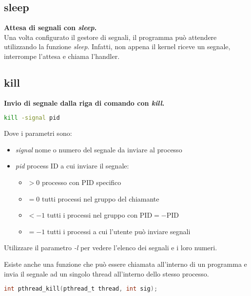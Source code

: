 \subsection{sleep}
\textbf{Attesa di segnali con \textit{sleep}.}\\
Una volta configurato il gestore di segnali, il programma può attendere utilizzando la funzione \textit{sleep}. Infatti, non appena il kernel riceve un segnale, interrompe l'attesa e chiama l'handler.
\subsection{kill}
\textbf{Invio di segnale dalla riga di comando con \textit{kill}.}\\
\begin{lstlisting}[language=BASH]
	kill -signal pid
\end{lstlisting}
Dove i parametri sono:
\begin{itemize}
	\item \textit{signal} nome o numero del segnale da inviare al processo
	\item \textit{pid} process ID a cui inviare il segnale:
	\begin{itemize}
		\item $>0$ processo con PID specifico
		\item $=0$ tutti processi nel gruppo del chiamante
		\item $<-1$ tutti i processi nel gruppo con PID$=-$PID
		\item $=-1$ tutti i processi a cui l'utente può inviare segnali
	\end{itemize}
\end{itemize}
\begin{note}
	Utilizzare il parametro \textit{-l} per vedere l'elenco dei segnali e i loro numeri.
\end{note}
Esiste anche una funzione che può essere chiamata all'interno di un programma e invia il segnale ad un singolo thread all'interno dello stesso processo.
\begin{lstlisting}[language=C]
	int pthread_kill(pthread_t thread, int sig);
\end{lstlisting}

